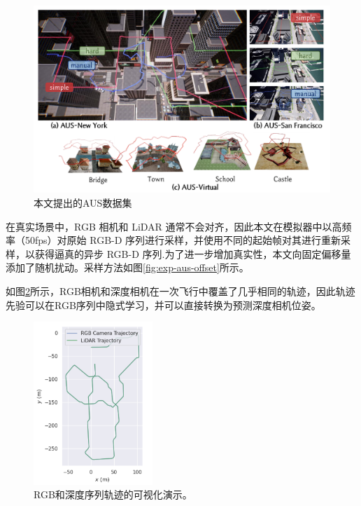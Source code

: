 \begin{figure}[ht]
    \centering
    \includegraphics[width=\textwidth]{undergraduate-thesis/images/experiments/Dataset-city.pdf}
    \caption{本文提出的AUS数据集}
    \label{fig:exp-aus-dataset}
\end{figure}

在真实场景中，RGB 相机和 LiDAR 通常不会对齐，因此本文在模拟器中以高频率（50fps）对原始 RGB-D 序列进行采样，并使用不同的起始帧对其进行重新采样，以获得逼真的异步 RGB-D 序列.为了进一步增加真实性，本文向固定偏移量添加了随机扰动。采样方法如图\ref{fig:exp-aus-offset}所示。

如图\ref{fig:exp-rgbd-alignment}所示，RGB相机和深度相机在一次飞行中覆盖了几乎相同的轨迹，因此轨迹先验可以在RGB序列中隐式学习，并可以直接转换为预测深度相机位姿。
\begin{figure}[ht]
    \centering
    \includegraphics[width=0.4\textwidth]{undergraduate-thesis/images/time-pose function/RGBD_alignment.pdf}
    \caption{RGB和深度序列轨迹的可视化演示。}
    \label{fig:exp-rgbd-alignment}
\end{figure}

